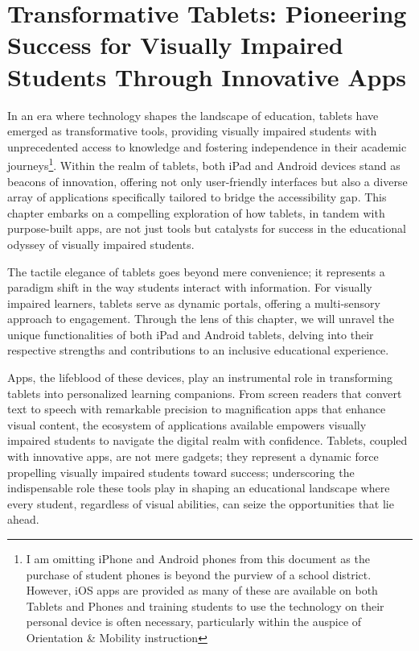 \documentclass[12pt,letterpaper,twoside,openright]{report}
\begin{document}
\cleardoublepage \hypertarget{ios-devices}{}\chapter[\raggedright Transformative Tablets:\hfill\break 
 Pioneering Success for Visually Impaired Students Through\hfill\break  Innovative Apps]{Transformative Tablets: Pioneering Success for Visually Impaired Students Through Innovative Apps}\label{ios-devices}
\minitoc \newpage
{}
In an era where technology shapes the landscape of education, tablets have emerged as transformative tools, providing visually impaired students with unprecedented access to knowledge and fostering independence in their academic journeys\footnote{\raggedright I am omitting iPhone and Android phones from this document as the purchase of student phones is beyond the purview of a school district. However, iOS apps are provided as many of these are available on both Tablets and Phones and training students to use the technology on their personal device is often necessary, particularly within the auspice of Orientation \& Mobility instruction}. Within the realm of tablets, both iPad and Android devices stand as beacons of innovation, offering not only user-friendly interfaces but also a diverse array of applications specifically tailored to bridge the accessibility gap. This chapter embarks on a compelling exploration of how tablets, in tandem with purpose-built apps, are not just tools but catalysts for success in the educational odyssey of visually impaired students.

The tactile elegance of tablets goes beyond mere convenience; it represents a paradigm shift in the way students interact with information. For visually impaired learners, tablets serve as dynamic portals, offering a multi-sensory approach to engagement. Through the lens of this chapter, we will unravel the unique functionalities of both iPad and Android tablets, delving into their respective strengths and contributions to an inclusive educational experience.

Apps, the lifeblood of these devices, play an instrumental role in transforming tablets into personalized learning companions. From screen readers that convert text to speech with remarkable precision to magnification apps that enhance visual content, the ecosystem of applications available empowers visually impaired students to navigate the digital realm with confidence. Tablets, coupled with innovative apps, are not mere gadgets; they represent a dynamic force propelling visually impaired students toward success; underscoring the indispensable role these tools play in shaping an educational landscape where every student, regardless of visual abilities, can seize the opportunities that lie ahead.
\end{document}

